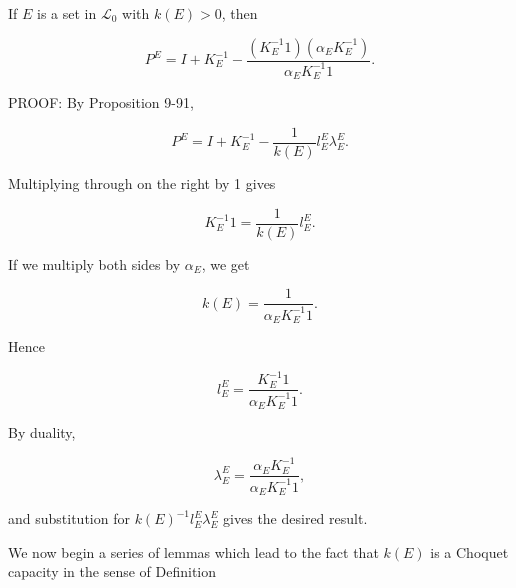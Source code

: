 If $E$ is a set in $\mathcal{L}_0$ with $k(E) > 0$, then

$$P^E = I + K_E^{-1} - \frac{(K_E^{-1}1)(\alpha_E K_E^{-1})}{\alpha_E K_E^{-1}1}.$$

PROOF: By Proposition 9-91,

$$P^E = I + K_E^{-1} - \frac{1}{k(E)} l_E^E \lambda_E^E.$$

Multiplying through on the right by 1 gives

$$K_E^{-1}1 = \frac{1}{k(E)} l_E^E.$$

If we multiply both sides by $\alpha_E$, we get

$$k(E) = \frac{1}{\alpha_E K_E^{-1}1}.$$

Hence

$$l_E^E = \frac{K_E^{-1}1}{\alpha_E K_E^{-1}1}.$$

By duality,

$$\lambda_E^E = \frac{\alpha_E K_E^{-1}}{\alpha_E K_E^{-1}1},$$

and substitution for $k(E)^{-1}l_E^E \lambda_E^E$ gives the desired result.

We now begin a series of lemmas which lead to the fact that $k(E)$ is a Choquet capacity in the sense of Definition
